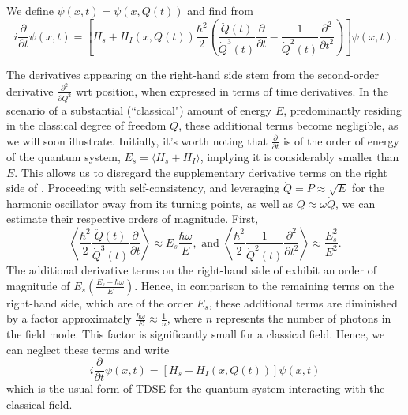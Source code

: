 We define \(\psi(x, t) = \psi(x, Q(t))\) and find from 
\begin{equation}
    \label{eq:class_jcm_eq15}
    i \frac{\partial}{\partial t}\psi(x, t) = \left[ H_s + H_I(x,Q(t)) 
    \frac{\hbar^2}{2} \left(\frac{\ddot{Q}(t)}{\dot{Q}^3(t)}\frac{\partial}{\partial t}
    - \frac{1}{\dot{Q}^2(t)} 
    \frac{\partial^2}{\partial t^2}\right)\right]\psi(x, t).
\end{equation}

The derivatives appearing on the right-hand side stem from the second-order derivative 
$\frac{\partial^2}{\partial Q^2}$ wrt position, when expressed in terms 
of time derivatives. In the scenario of a substantial (``classical") amount of 
energy $E$, predominantly residing in the classical degree of freedom $Q$, these additional 
terms become negligible, as we will soon illustrate. Initially, it's worth noting that 
$\frac{\partial}{\partial t}$ is of the order of energy of the quantum system, 
$E_s = \langle H_s + H_I\rangle$, implying it is considerably smaller than $E$. This allows us to 
disregard the supplementary derivative terms on the right side of . 
Proceeding with self-consistency, and leveraging ${\dot{Q}} = P \approx \sqrt{E}$ 
for the harmonic oscillator away from its turning points, as well as 
$\ddot{Q} \approx \omega \dot{Q}$, we can estimate their respective orders of magnitude.
First, 
\begin{equation}
    \label{eq:class_jcm_eq16}
    \left \langle \frac{\hbar^2}{2} \frac{\ddot{Q}(t)}{\dot{Q}^3(t)}\frac{\partial}{\partial t} \right\rangle
    \approx E_s \frac{\hbar \omega}{E}, \text{ and } \left \langle\frac{\hbar^2}{2} \frac{1}{\dot{Q}^2(t)} 
    \frac{\partial^2}{\partial t^2} \right\rangle \approx \frac{E_s^2}{E^2}.
\end{equation}
The additional derivative terms on the right-hand side of  
exhibit an order of magnitude of $E_s\left(\frac{E_s + \hbar \omega}{E}\right)$. 
Hence, in comparison to the remaining terms on the right-hand side, which are of 
the order $E_s$, these additional terms are diminished by a factor approximately 
$\frac{\hbar \omega}{E} \approx \frac{1}{n}$, where $n$ represents the number of
photons in the field mode.
This factor is significantly small for a classical field. Hence, we can neglect these 
terms and write
\begin{equation}
    \label{eq:class_jcm_eq17}
    i \frac{\partial}{\partial t}\psi(x, t) = \left[ H_s + H_I(x,Q(t))\right]\psi(x, t)
\end{equation}
which is the usual form of TDSE for the quantum system interacting with the classical field.

